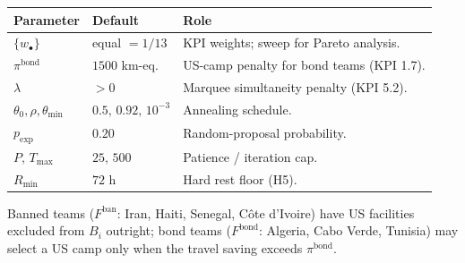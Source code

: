\documentclass[12pt, letterpaper]{article}
\begin{document}
\begin{center}
\renewcommand{\arraystretch}{1.2}
\begin{tabular}{@{}llp{6.4cm}@{}}
\toprule
\textbf{Parameter} & \textbf{Default} & \textbf{Role} \\
\midrule
$\{w_\bullet\}$ & equal $=1/13$ & KPI weights; sweep for Pareto
  analysis. \\
$\pi^{\mathrm{bond}}$ & $1500$ km-eq. & US-camp penalty for bond teams
  (KPI 1.7). \\
$\lambda$ & $>0$ & Marquee simultaneity penalty (KPI 5.2). \\
$\theta_0,\rho,\theta_{\min}$ & $0.5,\,0.92,\,10^{-3}$ & Annealing
  schedule. \\
$p_{\mathrm{exp}}$ & $0.20$ & Random-proposal probability. \\
$P,\,T_{\max}$ & $25,\,500$ & Patience / iteration cap. \\
$R_{\min}$ & $72$ h & Hard rest floor (H5). \\
\bottomrule
\end{tabular}
\end{center}

\noindent
Banned teams ($F^{\mathrm{ban}}$: Iran, Haiti, Senegal, C\^ote
d'Ivoire) have US facilities excluded from $B_i$ outright; bond teams
($F^{\mathrm{bond}}$: Algeria, Cabo Verde, Tunisia) may select a US camp
only when the travel saving exceeds $\pi^{\mathrm{bond}}$.



\end{document}
